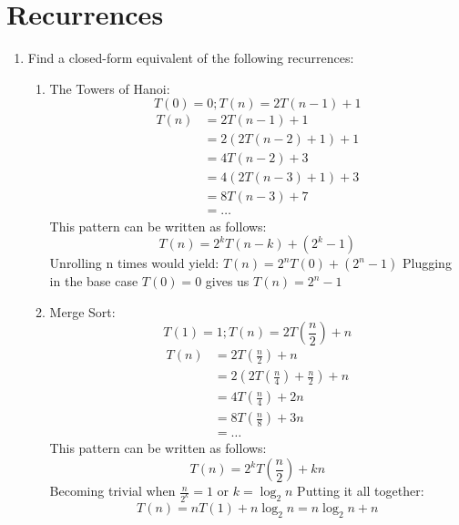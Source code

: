 \documentclass[11pt]{article}
\begin{document}
    \section{Recurrences}
    \begin{enumerate}
        \item Find a closed-form equivalent of the following recurrences:
        \begin{enumerate} 
            \item The Towers of Hanoi:
            $$T(0) = 0; T(n) = 2T(n-1) + 1$$
            \begin{equation}
                \begin{split}
                    T(n) & = 2T(n-1) + 1 \\
                         & = 2(2T(n-2) + 1) + 1 \\
                         & = 4T(n-2) + 3 \\
                         & = 4(2T(n-3) + 1) + 3 \\
                         & = 8T(n-3) + 7 \\
                         & = \ldots
                \end{split}
            \end{equation}
            This pattern can be written as follows: $$T(n) = 2^kT(n-k) + (2^k - 1)$$ 
            Unrolling n times would yield: $T(n) = 2^nT(0) + (2^n - 1)$
            Plugging in the base case $T(0) = 0$ gives us $T(n) = 2^n - 1$
        
            \item Merge Sort:
            $$T(1) = 1; T(n) = 2T(\frac{n}{2}) + n$$
            \begin{equation}
                \begin{split}
                    T(n) & = 2T(\frac{n}{2}) + n \\
                         & = 2(2T(\frac{n}{4}) + \frac{n}{2}) + n \\
                         & = 4T(\frac{n}{4}) + 2n \\
                         & = 8T(\frac{n}{8}) + 3n \\
                         & = \ldots
                \end{split}
            \end{equation}
            This pattern can be written as follows: $$T(n) = 2^kT(\frac{n}{2}) + kn$$
            Becoming trivial when $\frac{n}{2^k} = 1$ or $k = \log_{2}n$
            Putting it all together: $$T(n) = nT(1) + n \log_{2}n = n \log_{2}n + n$$
        

\end{enumerate}
\end{enumerate}
\end{document}
